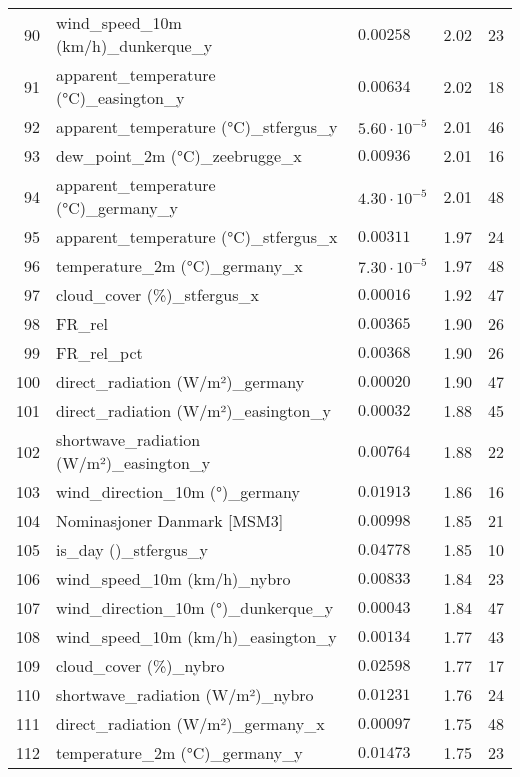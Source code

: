 \begin{table}[H]
\begin{tabular}{r l l l l}
        90 & wind\_speed\_10m (km/h)\_dunkerque\_y & $0.00258$ & 2.02 & 23 \\
        91 & apparent\_temperature (°C)\_easington\_y & $0.00634$ & 2.02 & 18 \\
        92 & apparent\_temperature (°C)\_stfergus\_y & $5.60 \cdot 10^{-5}$ & 2.01 & 46 \\
        93 & dew\_point\_2m (°C)\_zeebrugge\_x & $0.00936$ & 2.01 & 16 \\
        94 & apparent\_temperature (°C)\_germany\_y & $4.30 \cdot 10^{-5}$ & 2.01 & 48 \\
        95 & apparent\_temperature (°C)\_stfergus\_x & $0.00311$ & 1.97 & 24 \\
        96 & temperature\_2m (°C)\_germany\_x & $7.30 \cdot 10^{-5}$ & 1.97 & 48 \\
        97 & cloud\_cover (\%)\_stfergus\_x & $0.00016$ & 1.92 & 47 \\
        98 & FR\_rel & $0.00365$ & 1.90 & 26 \\
        99 & FR\_rel\_pct & $0.00368$ & 1.90 & 26 \\
        100 & direct\_radiation (W/m²)\_germany & $0.00020$ & 1.90 & 47 \\
        101 & direct\_radiation (W/m²)\_easington\_y & $0.00032$ & 1.88 & 45 \\
        102 & shortwave\_radiation (W/m²)\_easington\_y & $0.00764$ & 1.88 & 22 \\
        103 & wind\_direction\_10m (°)\_germany & $0.01913$ & 1.86 & 16 \\
        104 & Nominasjoner Danmark [MSM3] & $0.00998$ & 1.85 & 21 \\
        105 & is\_day ()\_stfergus\_y & $0.04778$ & 1.85 & 10 \\
        106 & wind\_speed\_10m (km/h)\_nybro & $0.00833$ & 1.84 & 23 \\
        107 & wind\_direction\_10m (°)\_dunkerque\_y & $0.00043$ & 1.84 & 47 \\
        108 & wind\_speed\_10m (km/h)\_easington\_y & $0.00134$ & 1.77 & 43 \\
        109 & cloud\_cover (\%)\_nybro & $0.02598$ & 1.77 & 17 \\
        110 & shortwave\_radiation (W/m²)\_nybro & $0.01231$ & 1.76 & 24 \\
        111 & direct\_radiation (W/m²)\_germany\_x & $0.00097$ & 1.75 & 48 \\
        112 & temperature\_2m (°C)\_germany\_y & $0.01473$ & 1.75 & 23 \\

\end{tabular}
\end{table}
